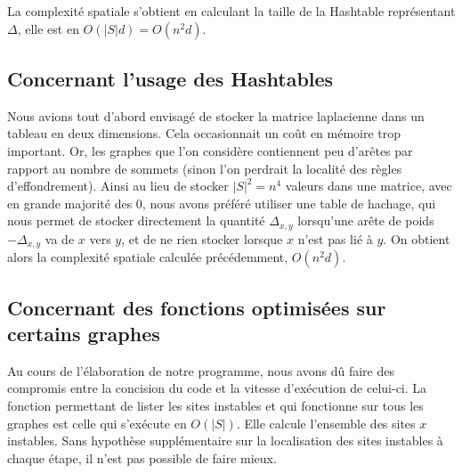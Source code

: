 \documentclass{article}
\begin{document}
La complexité spatiale s'obtient en calculant la taille de la Hashtable représentant $\Delta$, elle est en $O(|S| d) = O(n^2 d)$.
\subsection{Concernant l'usage des Hashtables}
Nous avions tout d'abord envisagé de stocker la matrice laplacienne dans un tableau en deux dimensions. Cela occasionnait un coût en mémoire trop important. Or, les graphes que l'on considère contiennent peu d'arêtes par rapport au nombre de sommets (sinon l'on perdrait la localité des règles d'effondrement). Ainsi au lieu de stocker $|S|^2 = n^4$ valeurs dans une matrice, avec en grande majorité des $0$, nous avons préféré utiliser une table de hachage, qui nous permet de stocker directement la quantité $\Delta_{x,y}$ lorsqu'une arête de poids $-\Delta_{x,y}$ va de $x$ vers $y$, et de ne rien stocker lorsque $x$ n'est pas lié à $y$. On obtient alors la complexité spatiale calculée précédemment, $O(n^2d)$.
\subsection{Concernant des fonctions optimisées sur certains graphes}
Au cours de l'élaboration de notre programme, nous avons dû faire des compromis entre la concision du code et la vitesse d'exécution de celui-ci. La fonction permettant de lister les sites instables et qui fonctionne sur tous les graphes est celle qui s’exécute en $O(|S|)$. Elle calcule l'ensemble des sites $x$ instables. Sans hypothèse supplémentaire sur la localisation des sites instables à chaque étape, il n'est pas possible de faire mieux. 
\end{document}
